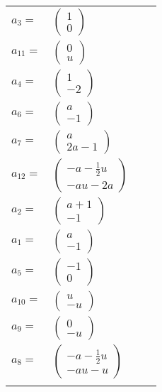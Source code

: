 \documentclass[1p]{elsarticle_modified}
\theoremstyle{definition}
\begin{document}
\begin{tabular}{m{7pt} m{180pt} m{7pt} m{180pt} }
\flushright $a_{3}=$&$\begin{pmatrix}1\\0\end{pmatrix}$ \\
\flushright $a_{11}=$&$\begin{pmatrix}0\\u\end{pmatrix}$ \\
\flushright $a_{4}=$&$\begin{pmatrix}1\\-2\end{pmatrix}$ \\
\flushright $a_{6}=$&$\begin{pmatrix}a\\-1\end{pmatrix}$ \\
\flushright $a_{7}=$&$\begin{pmatrix}a\\2 a-1\end{pmatrix}$ \\
\flushright $a_{12}=$&$\begin{pmatrix}- a-\frac{1}{2} u\\- a u-2 a\end{pmatrix}$ \\
\flushright $a_{2}=$&$\begin{pmatrix}a+1\\-1\end{pmatrix}$ \\
\flushright $a_{1}=$&$\begin{pmatrix}a\\-1\end{pmatrix}$ \\
\flushright $a_{5}=$&$\begin{pmatrix}-1\\0\end{pmatrix}$ \\
\flushright $a_{10}=$&$\begin{pmatrix}u\\- u\end{pmatrix}$ \\
\flushright $a_{9}=$&$\begin{pmatrix}0\\- u\end{pmatrix}$ \\
\flushright $a_{8}=$&$\begin{pmatrix}- a-\frac{1}{2} u\\- a u- u\end{pmatrix}$\\&\end{tabular}
\end{document}
